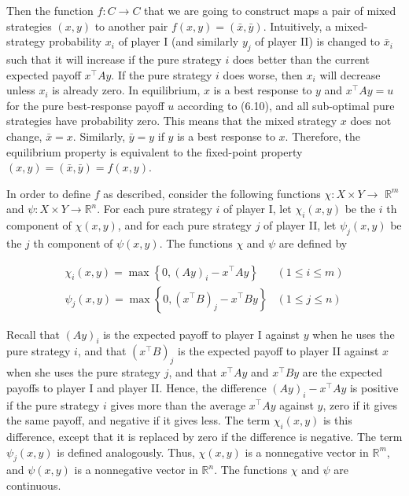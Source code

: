 \documentclass[12pt]{article}
\begin{document}
Then the function $f: C \rightarrow C$ that we are going to construct maps a pair of mixed strategies $(x, y)$ to another pair $f(x, y)=(\bar{x}, \bar{y})$. Intuitively, a mixed-strategy probability $x_{i}$ of player I (and similarly $y_{j}$ of player II) is changed to $\bar{x}_{i}$ such that it will increase if the pure strategy $i$ does better than the current expected payoff $x^{\top} A y$. If the pure strategy $i$ does worse, then $x_{i}$ will decrease unless $x_{i}$ is already zero. In equilibrium, $x$ is a best response to $y$ and $x^{\top} A y=u$ for the pure best-response payoff $u$ according to (6.10), and all sub-optimal pure strategies have probability zero. This means that the mixed strategy $x$ does not change, $\bar{x}=x$. Similarly, $\bar{y}=y$ if $y$ is a best response to $x$. Therefore, the equilibrium property is equivalent to the fixed-point property $(x, y)=(\bar{x}, \bar{y})=f(x, y)$.

In order to define $f$ as described, consider the following functions $\chi: X \times Y \rightarrow$ $\mathbb{R}^{m}$ and $\psi: X \times Y \rightarrow \mathbb{R}^{n}$. For each pure strategy $i$ of player I, let $\chi_{i}(x, y)$ be the $i$ th component of $\chi(x, y)$, and for each pure strategy $j$ of player II, let $\psi_{j}(x, y)$ be the $j$ th component of $\psi(x, y)$. The functions $\chi$ and $\psi$ are defined by

\[
\begin{array}{ll}
\chi_{i}(x, y)=\max \left\{0,(A y)_{i}-x^{\top} A y\right\} & (1 \leq i \leq m) \\
\psi_{j}(x, y)=\max \left\{0,\left(x^{\top} B\right)_{j}-x^{\top} B y\right\} & (1 \leq j \leq n) \tag{6.21}
\end{array}
\]

Recall that $(A y)_{i}$ is the expected payoff to player I against $y$ when he uses the pure strategy $i$, and that $\left(x^{\top} B\right)_{j}$ is the expected payoff to player II against $x$ when she uses the pure strategy $j$, and that $x^{\top} A y$ and $x^{\top} B y$ are the expected payoffs to player I and player II. Hence, the difference $(A y)_{i}-x^{\top} A y$ is positive if the pure strategy $i$ gives more than the average $x^{\top} A y$ against $y$, zero if it gives the same payoff, and negative if it gives less. The term $\chi_{i}(x, y)$ is this difference, except that it is replaced by zero if the difference is negative. The term $\psi_{j}(x, y)$ is defined analogously. Thus, $\chi(x, y)$ is a nonnegative vector in $\mathbb{R}^{m}$, and $\psi(x, y)$ is a nonnegative vector in $\mathbb{R}^{n}$. The functions $\chi$ and $\psi$ are continuous.
\end{document}
